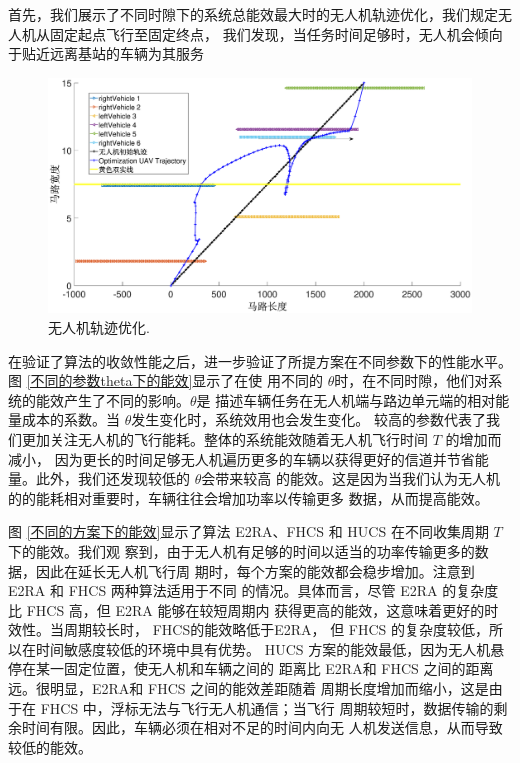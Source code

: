 首先，我们展示了不同时隙下的系统总能效最大时的无人机轨迹优化，我们规定无人机从固定起点飞行至固定终点，
我们发现，当任务时间足够时，无人机会倾向于贴近远离基站的车辆为其服务
\begin{figure}[H]
\centering
\includegraphics[width=16cm]{figures//chap4//大字体.eps}
\caption{无人机轨迹优化.}
\label{F67}
\end{figure}

在验证了算法的收敛性能之后，进一步验证了所提方案在不同参数下的性能水平。图 \ref{不同的参数theta下的能效}显示了在使
用不同的 $\theta$时，在不同时隙，他们对系统的能效产生了不同的影响。$\theta$是
描述车辆任务在无人机端与路边单元端的相对能量成本的系数。当 $\theta$发生变化时，系统效用也会发生变化。
较高的参数代表了我们更加关注无人机的飞行能耗。整体的系统能效随着无人机飞行时间 $T$ 的增加而减小，
因为更长的时间足够无人机遍历更多的车辆以获得更好的信道并节省能量。此外，我们还发现较低的 $\theta$会带来较高
的能效。这是因为当我们认为无人机的的能耗相对重要时，车辆往往会增加功率以传输更多
数据，从而提高能效。


图 \ref{不同的方案下的能效}显示了算法 E2RA、FHCS 和 HUCS 在不同收集周期 $T $下的能效。我们观
察到，由于无人机有足够的时间以适当的功率传输更多的数据，因此在延长无人机飞行周
期时，每个方案的能效都会稳步增加。注意到 E2RA 和 FHCS 两种算法适用于不同
的情况。具体而言，尽管 E2RA 的复杂度比 FHCS 高，但 E2RA 能够在较短周期内
获得更高的能效，这意味着更好的时效性。当周期较长时， FHCS的能效略低于E2RA，
但 FHCS 的复杂度较低，所以在时间敏感度较低的环境中具有优势。
HUCS 方案的能效最低，因为无人机悬停在某一固定位置，使无人机和车辆之间的
距离比 E2RA和 FHCS 之间的距离远。很明显，E2RA和 FHCS 之间的能效差距随着
周期长度增加而缩小，这是由于在 FHCS 中，浮标无法与飞行无人机通信；当飞行
周期较短时，数据传输的剩余时间有限。因此，车辆必须在相对不足的时间内向无
人机发送信息，从而导致较低的能效。

